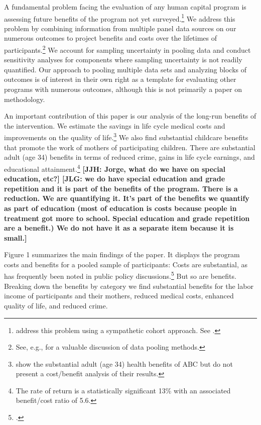 A fundamental problem facing the evaluation of any human capital program is assessing future benefits of the program not yet surveyed.\footnote{\cite{Mincer_Polachek_1974_JPE} address this problem using a sympathetic cohort approach. See \cite{Heckman_Lochner_etal_2008_JHC}.} We address this problem by combining information from multiple panel data sources on our numerous outcomes to project benefits and costs over the lifetimes of participants.\footnote{See, e.g., \citealp{Ridder_Moffitt_2007_hbk_metricsdata} for a valuable discussion of data pooling methods.} We account for sampling uncertainty in pooling data and conduct sensitivity analyses for components where sampling uncertainty is not readily quantified. Our approach to pooling multiple data sets and analyzing blocks of outcomes is of interest in their own right as a template for evaluating other programs with numerous outcomes, although this is not primarily a paper on methodology.

An important contribution of this paper is our analysis of the long-run benefits of the intervention. We estimate the savings in life cycle medical costs and improvements on the quality of life.\footnote{\cite{Campbell_Conti_etal_2014_EarlyChildhoodInvestments} show the substantial adult (age 34) health benefits of ABC but do not present a cost/benefit analysis of their results.} We also find substantial childcare benefits that promote the work of mothers of participating children. There are substantial adult (age 34) benefits in terms of reduced crime, gains in life cycle earnings, and educational attainment.\footnote{The rate of return is a statistically significant 13\% with an associated benefit/cost ratio of 5.6.} \textbf{[JJH: Jorge, what do we have on special education, etc?] [JLG: we do have special education and grade repetition and it is part of the benefits of the program. There is a reduction. We are quantifying it. It's part of the benefits we quantify as part of education (most of education is costs because people in treatment got more to school. Special education and grade repetition are a benefit.) We do not have it as a separate item because it is small.]}

Figure 1 summarizes the main findings of the paper. It displays the program costs and benefits for a pooled sample of participants: Costs are substantial, as has frequently been noted in public policy discussions.\footnote{\cite{Whitehurst_2014_Senate_Testimony}.} But so are benefits. Breaking down the benefits by category we find substantial benefits for the labor income of participants and their mothers, reduced medical costs, enhanced quality of life, and reduced crime.

